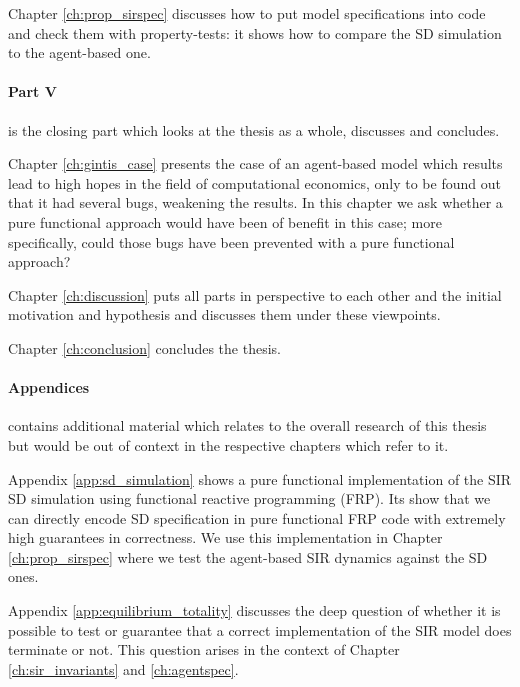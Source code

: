 \medskip

Chapter \ref{ch:prop_sirspec} discusses how to put model specifications into code and check them with property-tests: it shows how to compare the SD simulation to the agent-based one.

\medskip

\paragraph{Part V} is the closing part which looks at the thesis as a whole, discusses and concludes.
\medskip

Chapter \ref{ch:gintis_case} presents the case of an agent-based model which results lead to high hopes in the field of computational economics, only to be found out that it had several bugs, weakening the results. In this chapter we ask whether a pure functional approach would have been of benefit in this case; more specifically, could those bugs have been prevented with a pure functional approach?

\medskip

Chapter \ref{ch:discussion} puts all parts in perspective to each other and the initial motivation and hypothesis and discusses them under these viewpoints.

\medskip

Chapter \ref{ch:conclusion} concludes the thesis.

\paragraph{Appendices} contains additional material which relates to the overall research of this thesis but would be out of context in the respective chapters which refer to it.
\medskip

Appendix \ref{app:sd_simulation} shows a pure functional implementation of the SIR SD simulation using functional reactive programming (FRP). Its show that we can directly encode SD specification in pure functional FRP code with extremely high guarantees in correctness. We use this implementation in Chapter \ref{ch:prop_sirspec} where we test the agent-based SIR dynamics against the SD ones.

\medskip

Appendix \ref{app:equilibrium_totality} discusses the deep question of whether it is possible to test or guarantee that a correct implementation of the SIR model does terminate or not. This question arises in the context of Chapter \ref{ch:sir_invariants} and \ref{ch:agentspec}.

